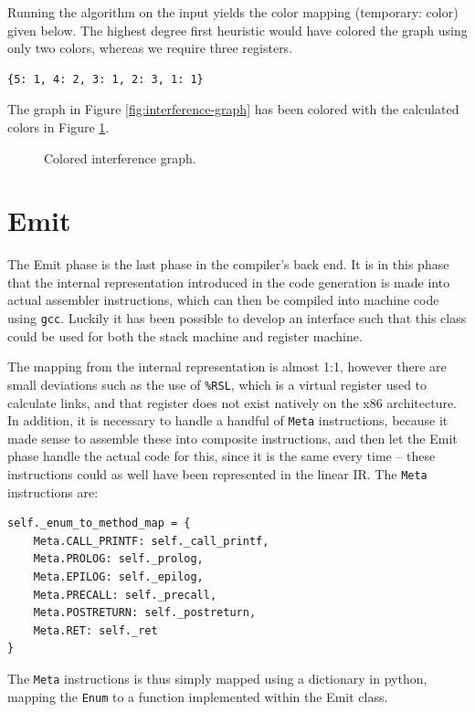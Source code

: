 Running the algorithm on the input yields the color mapping (temporary: color) given below. The highest degree first heuristic would have colored the graph using only two colors, whereas we require three registers.

\begin{verbatim}
{5: 1, 4: 2, 3: 1, 2: 3, 1: 1}
\end{verbatim}

The graph in Figure \ref{fig:interference-graph} has been colored with the calculated colors in Figure \ref{fig:colored-interference-graph}.

\begin{figure}[H]
    \centering
    
    \caption{Colored interference graph.}
    \label{fig:colored-interference-graph}
\end{figure}

\section{Emit}
The Emit phase is the last phase in the compiler's back end. It is in this phase that the internal representation introduced in the code generation is made into actual assembler instructions, which can then be compiled into machine code using \texttt{gcc}. Luckily it has been possible to develop an interface such that this class could be used for both the stack machine and register machine.

The mapping from the internal representation is almost 1:1, however there are small deviations such as the use of \texttt{\%RSL}, which is a virtual register used to calculate links, and that register does not exist natively on the x86 architecture. In addition, it is necessary to handle a handful of \texttt{Meta} instructions, because it made sense to assemble these into composite instructions, and then let the Emit phase handle the actual code for this, since it is the same every time -- these instructions could as well have been represented in the linear IR. The \texttt{Meta} instructions are:

\begin{verbatim}
self._enum_to_method_map = {
    Meta.CALL_PRINTF: self._call_printf,
    Meta.PROLOG: self._prolog,
    Meta.EPILOG: self._epilog,
    Meta.PRECALL: self._precall,
    Meta.POSTRETURN: self._postreturn,
    Meta.RET: self._ret
}
\end{verbatim}

The \texttt{Meta} instructions is thus simply mapped using a dictionary in python, mapping the \texttt{Enum} to a function implemented within the Emit class.

